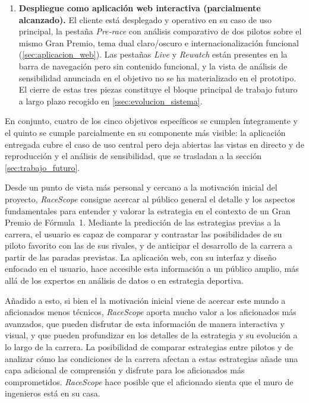\begin{enumerate}
    \item \textbf{Despliegue como aplicación web interactiva (parcialmente alcanzado).} El cliente está desplegado y operativo en su caso de uso principal, la pestaña \textit{Pre-race} con análisis comparativo de dos pilotos sobre el mismo Gran Premio, tema dual claro/oscuro e internacionalización funcional (\ref{sec:aplicacion_web}). Las pestañas \textit{Live} y \textit{Rewatch} están presentes en la barra de navegación pero sin contenido funcional, y la vista de análisis de sensibilidad anunciada en el objetivo no se ha materializado en el prototipo. El cierre de estas tres piezas constituye el bloque principal de trabajo futuro a largo plazo recogido en \ref{ssec:evolucion_sistema}.
\end{enumerate}

En conjunto, cuatro de los cinco objetivos específicos se cumplen íntegramente y el quinto se cumple parcialmente en su componente más visible: la aplicación entregada cubre el caso de uso central pero deja abiertas las vistas en directo y de reproducción y el análisis de sensibilidad, que se trasladan a la sección \ref{sec:trabajo_futuro}.

Desde un punto de vista más personal y cercano a la motivación inicial del proyecto, \textit{RaceScope} consigue acercar al público general el detalle y los aspectos fundamentales para entender y valorar la estrategia en el contexto de un Gran Premio de Fórmula~1. Mediante la predicción de las estrategias previas a la carrera, el usuario es capaz de comparar y contrastar las posibilidades de su piloto favorito con las de sus rivales, y de anticipar el desarrollo de la carrera a partir de las paradas previstas. La aplicación web, con su interfaz y diseño enfocado en el usuario, hace accesible esta información a un público amplio, más allá de los expertos en análisis de datos o en estrategia deportiva. 

Añadido a esto, si bien el la motivación inicial viene de acercar este mundo a aficionados menos técnicos, \textit{RaceScope} aporta mucho valor a los aficionados más avanzados, que pueden disfrutar de esta información de manera interactiva y visual, y que pueden profundizar en los detalles de la estrategia y su evolución a lo largo de la carrera. La posibilidad de comparar estrategias entre pilotos y de analizar cómo las condiciones de la carrera afectan a estas estrategias añade una capa adicional de comprensión y disfrute para los aficionados más comprometidos. \textit{RaceScope} hace posible que el aficionado sienta que el muro de ingenieros está en su casa.  

